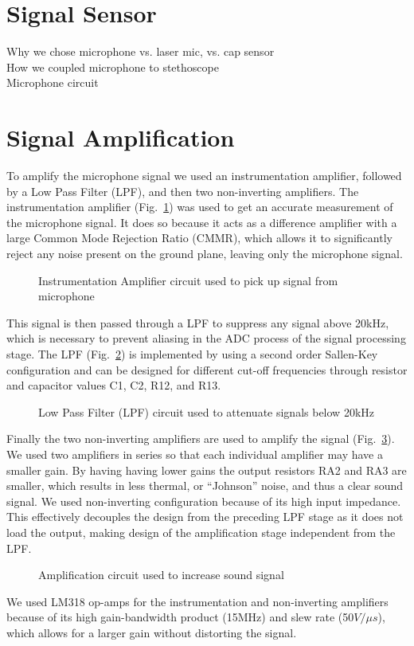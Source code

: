 \section{Signal Sensor}
Why we chose microphone vs. laser mic, vs. cap sensor \\
How we coupled microphone to stethoscope \\
Microphone circuit



\section{Signal Amplification}
To amplify the microphone signal we used an instrumentation amplifier, followed by a Low Pass Filter (LPF), and then two non-inverting amplifiers.
The instrumentation amplifier (Fig.~\ref{fig:inamp_circuit}) was used to get an accurate measurement of the microphone signal. It does so because it acts as a difference amplifier with a large Common Mode Rejection Ratio (CMMR), which allows it to significantly reject any noise present on the ground plane\cite[p.~86]{Franco2015}, leaving only the microphone signal. 
\begin{figure}[!htb]
	\centering
	\caption{Instrumentation Amplifier circuit used to pick up signal from microphone}
	\label{fig:inamp_circuit}
\end{figure}
This signal is then passed through a LPF to suppress any signal above 20kHz, which is necessary to prevent aliasing in the ADC process of the signal processing stage. The LPF (Fig.~\ref{fig:LPF_circuit}) is implemented by using a second order Sallen-Key configuration\cite[p.~279]{Horowitz1989} and can be designed for different cut-off frequencies through resistor and capacitor values C1, C2, R12, and R13. 
\begin{figure}[!htb]
	\centering
	\caption{Low Pass Filter (LPF) circuit used to attenuate signals below 20kHz}
	\label{fig:LPF_circuit}
\end{figure}
Finally the two non-inverting amplifiers are used to amplify the signal (Fig.~\ref{fig:amplifier_circuit}). We used two amplifiers in series so that each individual amplifier may have a smaller gain. By having having lower gains the output resistors RA2 and RA3 are smaller, which results in less thermal, or ``Johnson'' noise, and thus a clear sound signal. We used non-inverting configuration because of its high input impedance. This effectively decouples the design from the preceding LPF stage as it does not load the output, making design of the amplification stage independent from the LPF. 
\begin{figure}[!htb]
	\centering
	\caption{Amplification circuit used to increase sound signal}
	\label{fig:amplifier_circuit}
\end{figure}
We used LM318 op-amps for the instrumentation and non-inverting amplifiers because of its high gain-bandwidth product (15MHz) and slew rate (50$V/\mu s$), which allows for a larger gain without distorting the signal.

